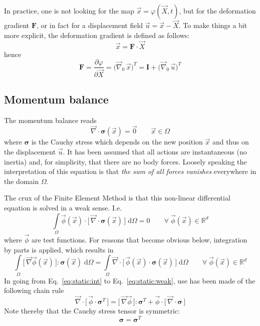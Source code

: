 \documentclass[times,namecite]{goose-article}
\begin{document}
In practice, one is not looking for the map $\vec{x} = \varphi(\vec{X},t)$, but for the deformation gradient $\bm{F}$,  or in fact for a displacement field $\vec{u} = \vec{x} - \vec{X}$. To make things a bit more explicit, the deformation gradient is defined as follows:
\begin{equation}
  \vec{x} = \bm{F} \cdot \vec{X}
\end{equation}
hence
\begin{equation}
  \bm{F}
  =
  \frac{\partial \varphi}{\partial \vec{X}}
  =
  \big( \vec{\nabla}_0 \, \vec{x} \big)^T
  =
  \bm{I} + \big( \vec{\nabla}_0 \, \vec{u} \big)^T
\end{equation}

\subsection{Momentum balance}

The momentum balance reads
\begin{equation}
\label{eq:static:momentum}
  \vec{\nabla} \cdot \bm{\sigma}(\vec{x}) = \vec{0}
  \qquad
  \vec{x} \in \Omega
\end{equation}
where $\bm{\sigma}$ is the Cauchy stress which depends on the new position $\vec{x}$ and thus on the displacement $\vec{u}$. It has been assumed that all actions are instantaneous (no inertia) and, for simplicity, that there are no body forces. Loosely speaking the interpretation of this equation is that \emph{the sum of all forces vanishes} everywhere in the domain $\Omega$.

The crux of the Finite Element Method is that this non-linear differential equation is solved in a weak sense. I.e.
\begin{equation}
\label{eq:static:int}
  \int\limits_\Omega
    \vec{\phi}(\vec{x}) \cdot \big[\, \vec{\nabla} \cdot \bm{\sigma}(\vec{x}) \,\big] \;
  \mathrm{d}\Omega
  =
  0
  \qquad
  \forall \; \vec{\phi}(\vec{x}) \in \mathbb{R}^d
\end{equation}
where $\vec{\phi}$ are test functions. For reasons that become obvious below, integration by parts is applied, which results in
\begin{equation}
\label{eq:static:weak}
  \int\limits_\Omega
    \big[\, \vec{\nabla} \vec{\phi}(\vec{x}) \,\big] : \bm{\sigma}(\vec{x}) \;
  \mathrm{d}\Omega
  =
  \int\limits_\Omega
    \vec{\nabla}
    \cdot
    \big[\, \vec{\phi}(\vec{x}) \cdot \bm{\sigma}(\vec{x}) \,\big] \;
  \mathrm{d}\Omega
  \qquad
  \forall \; \vec{\phi}(\vec{x}) \in \mathbb{R}^d
\end{equation}
In going from Eq.~\eqref{eq:static:int} to Eq.~\eqref{eq:static:weak}, use has been made of the following chain rule
\begin{equation}
  \vec{\nabla} \cdot \big[\, \vec{\phi} \cdot \bm{\sigma}^T \,\big]
  =
  \big[\, \vec{\nabla} \vec{\phi} \,\big] : \bm{\sigma}^T
  +
  \vec{\phi} \cdot \big[\, \vec{\nabla} \cdot \bm{\sigma} \,\big]
\end{equation}
Note thereby that the Cauchy stress tensor is symmetric:
\begin{equation}
  \bm{\sigma} = \bm{\sigma}^T
\end{equation}
\end{document}
